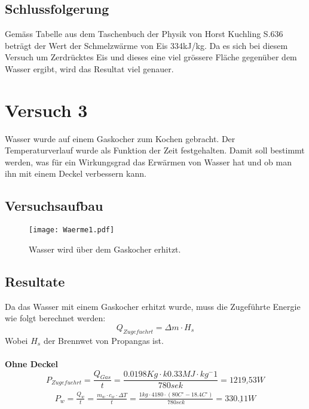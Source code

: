 \documentclass{article}
\begin{document}
\subsection{Schlussfolgerung}
Gemäss Tabelle aus dem Taschenbuch der Physik von Horst Kuchling S.636 beträgt der Wert der 
Schmelzwärme von Eis 334kJ/kg.  
Da es sich bei diesem Versuch um Zerdrücktes Eis und dieses eine viel grössere Fläche gegenüber 
dem Wasser ergibt, wird das Resultat viel genauer.
\section{Versuch 3}
Wasser wurde auf einem Gaskocher zum Kochen gebracht. Der 
Temperaturverlauf wurde als Funktion der Zeit festgehalten. Damit soll bestimmt werden, was für ein 
Wirkungsgrad das Erwärmen von Wasser hat und ob man ihn mit einem Deckel verbessern kann.  
\subsection{Versuchsaufbau}
\begin{figure}[H]
\begin{center}
\texttt{[image: Waerme1.pdf]} 
\caption{Wasser wird über dem Gaskocher erhitzt.}
\end{center}
\end{figure}
\subsection{Resultate}
Da das Wasser mit einem Gaskocher erhitzt wurde, muss die Zugeführte Energie wie folgt berechnet werden:
\begin{equation}
 Q_{Zugefuehrt} = \Delta m \cdot H_s
\end{equation}
Wobei $H_s$ der Brennwet von Propangas ist.\\\\
\textbf{Ohne Deckel}
\begin{equation}
P_{Zugefuehrt} = \frac{Q_{Gas}}{t} = \frac{0.0198Kg\cdot k0.33MJ \cdot kg^-1}{780sek} = \underline{1219.53 W }
\end{equation}
\begin{align}
\begin{split}
P_{w} = \frac{Q_w}{t} = \frac{m_{w} \cdot c_{w} \cdot \Delta T}{t}=  \frac{1kg \cdot 4180 \cdot (80C^\circ-18.4C^\circ)}{780sek} = \underline{330.11W}
\end{split}
\end{align}
\end{document}
